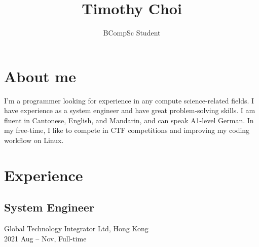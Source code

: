 \documentclass{article}
\begin{document}
\thispagestyle{fancy}

\vfill
    
\title{\vspace*{-1.5cm}Timothy Choi}
\author{BCompSc Student}
\date{}
\maketitle

\renewcommand{\headrulewidth}{0pt}
\thispagestyle{fancy}

\noindent\begin{minipage}{\textwidth}
    \section*{About me}
        I'm a programmer looking for experience in any compute science-related fields. I have experience as a system engineer and have great problem-solving skills. I am fluent in Cantonese, English, and Mandarin, and can speak A1-level German. In my free-time, I like to compete in CTF competitions and improving my coding workflow on Linux. 
\end{minipage}
\vspace{3em}

\noindent\begin{minipage}{\textwidth}
    \section*{Experience}
        \subsection*{System Engineer}
            Global Technology Integrator Ltd, Hong Kong \\
            2021 Aug -- Nov, Full-time
\end{minipage}
\vspace{3em}
\end{document}
